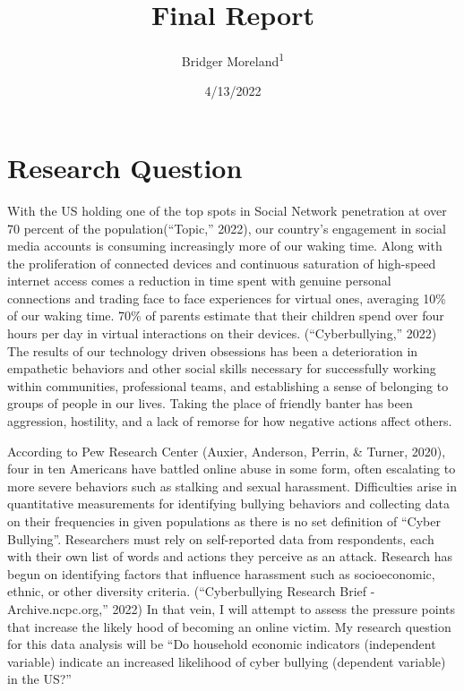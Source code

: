 \documentclass[
  man,LLO-8200, Introduction to Data Science]{apa6}
\title{Final Report}
\author{Bridger Moreland\textsuperscript{1}}
\date{4/13/2022}
\affiliation{\vspace{0.5cm}\textsuperscript{1} Vanderbilt University, Peabody College}
\begin{document}
\maketitle

\hypertarget{research-question}{%
\section{Research Question}\label{research-question}}

With the US holding one of the top spots in Social Network penetration at over 70 percent of the population({``Topic,''} 2022), our country's engagement in social media accounts is consuming increasingly more of our waking time. Along with the proliferation of connected devices and continuous saturation of high-speed internet access comes a reduction in time spent with genuine personal connections and trading face to face experiences for virtual ones, averaging 10\% of our waking time. 70\% of parents estimate that their children spend over four hours per day in virtual interactions on their devices. ({``Cyberbullying,''} 2022) The results of our technology driven obsessions has been a deterioration in empathetic behaviors and other social skills necessary for successfully working within communities, professional teams, and establishing a sense of belonging to groups of people in our lives. Taking the place of friendly banter has been aggression, hostility, and a lack of remorse for how negative actions affect others.

According to Pew Research Center (Auxier, Anderson, Perrin, \& Turner, 2020), four in ten Americans have battled online abuse in some form, often escalating to more severe behaviors such as stalking and sexual harassment. Difficulties arise in quantitative measurements for identifying bullying behaviors and collecting data on their frequencies in given populations as there is no set definition of ``Cyber Bullying''. Researchers must rely on self-reported data from respondents, each with their own list of words and actions they perceive as an attack. Research has begun on identifying factors that influence harassment such as socioeconomic, ethnic, or other diversity criteria. ({``Cyberbullying Research Brief - Archive.ncpc.org,''} 2022) In that vein, I will attempt to assess the pressure points that increase the likely hood of becoming an online victim. My research question for this data analysis will be ``Do household economic indicators (independent variable) indicate an increased likelihood of cyber bullying (dependent variable) in the US?''
\end{document}
